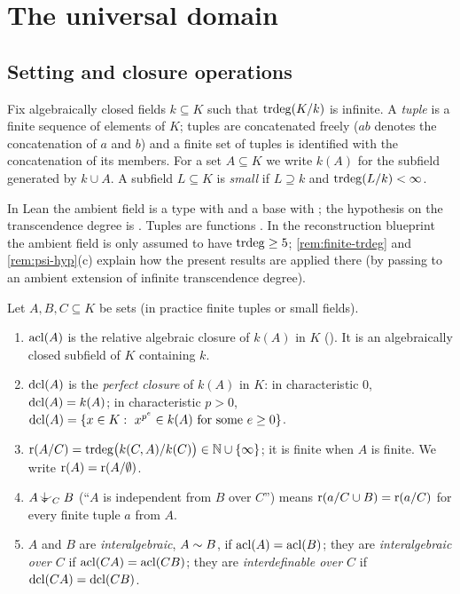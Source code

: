\section{The universal domain}
\label{sec:ud}

\subsection{Setting and closure operations}

\begin{convention}\label{conv:ud}
Fix algebraically closed fields $k\subseteq K$ such that $\operatorname{trdeg}(K/k)$ is infinite.
A \emph{tuple} is a finite sequence of elements of $K$; tuples are concatenated
freely ($ab$ denotes the concatenation of $a$ and $b$) and a finite set of tuples
is identified with the concatenation of its members.  For a set $A\subseteq K$ we
write $k(A)$ for the subfield generated by $k\cup A$.  A subfield $L\subseteq K$ is
\emph{small} if $L\supseteq k$ and $\operatorname{trdeg}(L/k)<\infty$.
\end{convention}

\begin{leannote}
In Lean the ambient field is a type  with \lean{[Field K] [IsAlgClosed K]}
and a base  with \lean{[Field k] [IsAlgClosed k] [Algebra k K]}; the
hypothesis on the transcendence degree is .
Tuples are functions .  In the reconstruction blueprint the ambient
field is only assumed to have $\operatorname{trdeg}\ge5$; \cref{rem:finite-trdeg} and
\cref{rem:psi-hyp}(c) explain how the present results are applied there (by passing to
an ambient extension of infinite transcendence degree).
\end{leannote}

\begin{definition}\label{def:closures}
Let $A,B,C\subseteq K$ be sets (in practice finite tuples or small fields).
\begin{enumerate}[nosep]
\item $\operatorname{acl}(A)$ is the relative algebraic closure of $k(A)$ in $K$ ().
  It is an algebraically closed subfield of $K$ containing $k$.
\item $\operatorname{dcl}(A)$ is the \emph{perfect closure} of $k(A)$ in $K$: in characteristic
  $0$, $\operatorname{dcl}(A)=k(A)$; in characteristic $p>0$,
  $\operatorname{dcl}(A)=\{x\in K:\ x^{p^e}\in k(A)\text{ for some }e\ge 0\}$.
\item $\operatorname{r}(A/C)=\operatorname{trdeg}\bigl(k(C,A)/k(C)\bigr)\in\mathbb N\cup\{\infty\}$; it is finite
  when $A$ is finite.  We write $\operatorname{r}(A)=\operatorname{r}(A/\emptyset)$.
\item $A\ind{C}B$ (``$A$ is independent from $B$ over $C$'') means
  $\operatorname{r}(a/C\cup B)=\operatorname{r}(a/C)$ for every finite tuple $a$ from $A$.
\item $A$ and $B$ are \emph{interalgebraic}, $A\sim B$, if $\operatorname{acl}(A)=\operatorname{acl}(B)$; they
  are \emph{interalgebraic over $C$} if $\operatorname{acl}(CA)=\operatorname{acl}(CB)$; they are
  \emph{interdefinable over $C$} if $\operatorname{dcl}(CA)=\operatorname{dcl}(CB)$.
\end{enumerate}
\end{definition}

